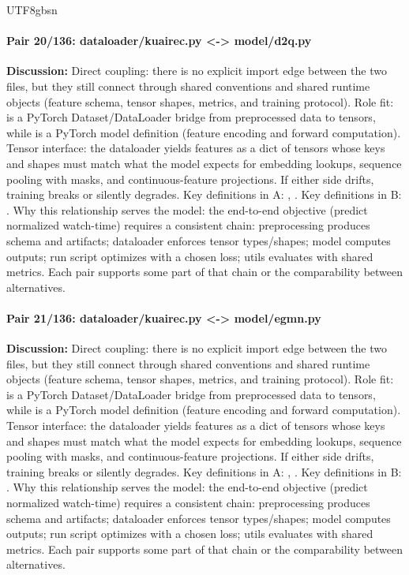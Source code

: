 \documentclass[11pt]{article}
\begin{document}
\begin{CJK*}{UTF8}{gbsn}
\paragraph{Pair 20/136: dataloader/kuairec.py <-> model/d2q.py}
\textbf{Discussion:} Direct coupling: there is no explicit import edge between the two files, but they still connect through shared conventions and shared runtime objects (feature schema, tensor shapes, metrics, and training protocol). Role fit: \texttt{} is a PyTorch Dataset/DataLoader bridge from preprocessed data to tensors, while \texttt{} is a PyTorch model definition (feature encoding and forward computation). Tensor interface: the dataloader yields features as a dict of tensors whose keys and shapes must match what the model expects for embedding lookups, sequence pooling with masks, and continuous-feature projections. If either side drifts, training breaks or silently degrades. Key definitions in A: \texttt{}, \texttt{}. Key definitions in B: \texttt{}. Why this relationship serves the model: the end-to-end objective (predict normalized watch-time) requires a consistent chain: preprocessing produces schema and artifacts; dataloader enforces tensor types/shapes; model computes outputs; run script optimizes with a chosen loss; utils evaluates with shared metrics. Each pair supports some part of that chain or the comparability between alternatives.

\paragraph{Pair 21/136: dataloader/kuairec.py <-> model/egmn.py}
\textbf{Discussion:} Direct coupling: there is no explicit import edge between the two files, but they still connect through shared conventions and shared runtime objects (feature schema, tensor shapes, metrics, and training protocol). Role fit: \texttt{} is a PyTorch Dataset/DataLoader bridge from preprocessed data to tensors, while \texttt{} is a PyTorch model definition (feature encoding and forward computation). Tensor interface: the dataloader yields features as a dict of tensors whose keys and shapes must match what the model expects for embedding lookups, sequence pooling with masks, and continuous-feature projections. If either side drifts, training breaks or silently degrades. Key definitions in A: \texttt{}, \texttt{}. Key definitions in B: \texttt{}. Why this relationship serves the model: the end-to-end objective (predict normalized watch-time) requires a consistent chain: preprocessing produces schema and artifacts; dataloader enforces tensor types/shapes; model computes outputs; run script optimizes with a chosen loss; utils evaluates with shared metrics. Each pair supports some part of that chain or the comparability between alternatives.


\end{CJK*}
\end{document}
